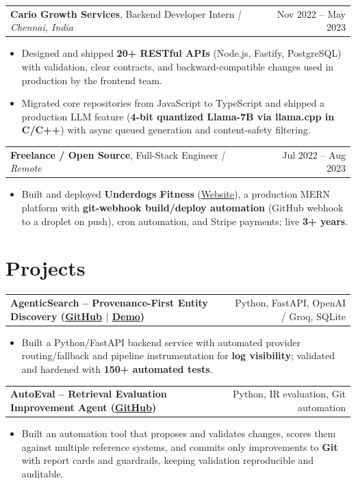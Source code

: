 \documentclass[letterpaper,11pt]{article}
\makeatletter
\newcommand{\expItem}[4]{%
  \vspace{3pt}
  \begin{tabular*}{\textwidth}{@{}l@{\extracolsep{\fill}}r@{}}
    \textbf{#1}, #2 \textit{| #3} & #4 \\
  \end{tabular*}\par\vspace{-2pt}
}
\newcommand{\projItem}[2]{%
  \vspace{6pt}
  \begin{tabular*}{\textwidth}{@{}l@{\extracolsep{\fill}}r@{}}
    \textbf{#1} & #2 \\
  \end{tabular*}\par\vspace{-2pt}
}
\makeatother
\begin{document}
\expItem{Cario Growth Services}{Backend Developer Intern}{Chennai, India}{Nov 2022 -- May 2023}
\begin{itemize}
  \item Designed and shipped \textbf{20+ RESTful APIs} (Node.js, Fastify, PostgreSQL) with validation, clear contracts, and backward-compatible changes used in production by the frontend team.
  \item Migrated core repositories from JavaScript to TypeScript and shipped a production LLM feature (\textbf{4-bit quantized Llama-7B via llama.cpp in C/C++}) with async queued generation and content-safety filtering.
\end{itemize}

\expItem{Freelance / Open Source}{Full-Stack Engineer}{Remote}{Jul 2022 -- Aug 2023}
\begin{itemize}
  \item Built and deployed \textbf{Underdogs Fitness} (\href{https://www.underdogsfitness.in/}{Website}), a production MERN platform with \textbf{git-webhook build/deploy automation} (GitHub webhook to a droplet on push), cron automation, and Stripe payments; live \textbf{3+ years}.
\end{itemize}

\section{Projects}

\projItem{AgenticSearch -- Provenance-First Entity Discovery {\normalfont\small(\href{https://github.com/Deva-1903/ciir_agentic_search}{GitHub} $\vert$ \href{https://agentic-search-negglszkwa-uc.a.run.app}{Demo})}}{Python, FastAPI, OpenAI / Groq, SQLite}
\begin{itemize}
  \item Built a Python/FastAPI backend service with automated provider routing/fallback and pipeline instrumentation for \textbf{log visibility}; validated and hardened with \textbf{150+ automated tests}.
\end{itemize}

\projItem{AutoEval -- Retrieval Evaluation Improvement Agent {\normalfont\small(\href{https://github.com/Deva-1903/AutoEval}{GitHub})}}{Python, IR evaluation, Git automation}
\begin{itemize}
  \item Built an automation tool that proposes and validates changes, scores them against multiple reference systems, and commits only improvements to \textbf{Git} with report cards and guardrails, keeping validation reproducible and auditable.
\end{itemize}
\end{document}
